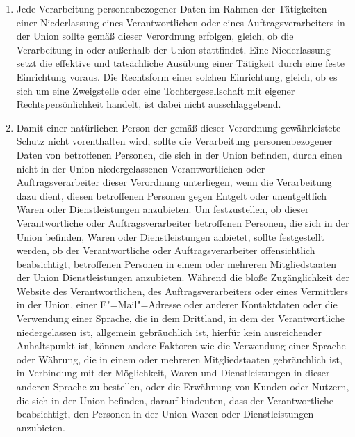 \begin{enumerate}

   \item Jede Verarbeitung personenbezogener Daten im Rahmen der Tätigkeiten einer Niederlassung eines Verantwortlichen
    oder eines Auftragsverarbeiters in der Union sollte gemäß dieser Verordnung erfolgen, gleich, ob die Verarbeitung
    in oder außerhalb der Union stattfindet. Eine Niederlassung setzt die effektive und tatsächliche Ausübung einer
    Tätigkeit durch eine feste Einrichtung voraus. Die Rechtsform einer solchen Einrichtung, gleich, ob es sich um eine
    Zweigstelle oder eine Tochtergesellschaft mit eigener Rechtspersönlichkeit handelt, ist dabei nicht
    ausschlaggebend.%
   \label{itm:eg-22}
   

   \item Damit einer natürlichen Person der gemäß dieser Verordnung gewährleistete Schutz nicht vorenthalten wird,
    sollte die Verarbeitung personenbezogener Daten von betroffenen Personen, die sich in der Union befinden, durch
    einen nicht in der Union niedergelassenen Verantwortlichen oder Auftragsverarbeiter dieser Verordnung unterliegen,
    wenn die Verarbeitung dazu dient, diesen betroffenen Personen gegen Entgelt oder unentgeltlich Waren oder
    Dienstleistungen anzubieten. Um festzustellen, ob dieser Verantwortliche oder Auftragsverarbeiter betroffenen
    Personen, die sich in der Union befinden, Waren oder Dienstleistungen anbietet, sollte festgestellt werden, ob der
    Verantwortliche oder Auftragsverarbeiter offensichtlich beabsichtigt, betroffenen Personen in einem oder mehreren
    Mitgliedstaaten der Union Dienstleistungen anzubieten. Während die bloße Zugänglichkeit der Website des
    Verantwortlichen, des Auftragsverarbeiters oder eines Vermittlers in der Union, einer E"=Mail"=Adresse oder anderer
    Kontaktdaten oder die Verwendung einer Sprache, die in dem Drittland, in dem der Verantwortliche niedergelassen
    ist, allgemein gebräuchlich ist, hierfür kein ausreichender Anhaltspunkt ist, können andere Faktoren wie die
    Verwendung einer Sprache oder Währung, die in einem oder mehreren Mitgliedstaaten gebräuchlich ist, in Verbindung
    mit der Möglichkeit, Waren und Dienstleistungen in dieser anderen Sprache zu bestellen, oder die Erwähnung von
    Kunden oder Nutzern, die sich in der Union befinden, darauf hindeuten, dass der Verantwortliche beabsichtigt, den
    Personen in der Union Waren oder Dienstleistungen anzubieten.%
   \label{itm:eg-23}
   

\end{enumerate}
